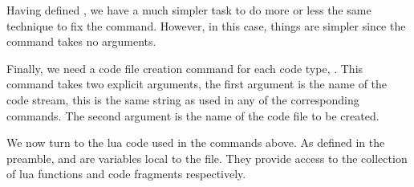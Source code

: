 \startMkIVCode
\def\fixStartLitProgs#1{%
  \letvalue{oldStart#1}=\getvalue{start#1}%
  \setuvalue{start#1}{%
    \dosingleempty\getvalue{start#1Direct}%
  }
  \setvalue{start#1Direct}{%
    \iffirstargument%
      \getvalue{start#1Single}%
    \else
      \getvalue{start#1Zero}%
    \fi
  }
  \setvalue{start#1Zero}{%
    \getvalue{start#1Single}[default]%
  }
  \setvalue{start#1Single}[#1]{%
    \directlua{thirddata.literateProgs.setCodeStream('#1')}%
    \getvalue{oldStart#1}%
  }
}
\stopMkIVCode

Having defined \type{\fixStartLitProgs}, we have a much simpler task to do 
more or less the same technique to fix the \type{\stopXXX} command. 
However, in this case, things are simpler since the \type{\stopXXX} 
command takes no arguments. 

\startMkIVCode
\def\fixStopLitProgs#1{%
  \letvalue{oldStop#1}=\getvalue{stop#1}%
  \setvalue{stop#1}{%
    \getvalue{oldStop#1}%
    \directlua{
      thirddata.literateProgs.addCode(
        '#1',
        '_typing_'
      )
    }
  }
}
\stopMkIVCode




Finally, we need a code file creation command for each code type, 
\type{\createXXXFile}. This command takes two explicit arguments, the 
first argument is the name of the code stream, this is the same string as 
used in any of the corresponding \type{\startXXX} commands. The second 
argument is the name of the code file to be created. 

\startMkIVCode
\def\defineLitProgsCreateFile#1{%
  \setvalue{create#1File}#2#3{%
    \directlua{
      thirddata.literateProgs.createCodeFile(
        '#1',
        '#2',
        '#3'
      )
    }
  }
}
\stopMkIVCode

We now turn to the lua code used in the \type{\directlua} commands above. 
As defined in the preamble,  and  are variables 
local to the  file. They provide access to the 
collection of lua functions and code fragments respectively. 

